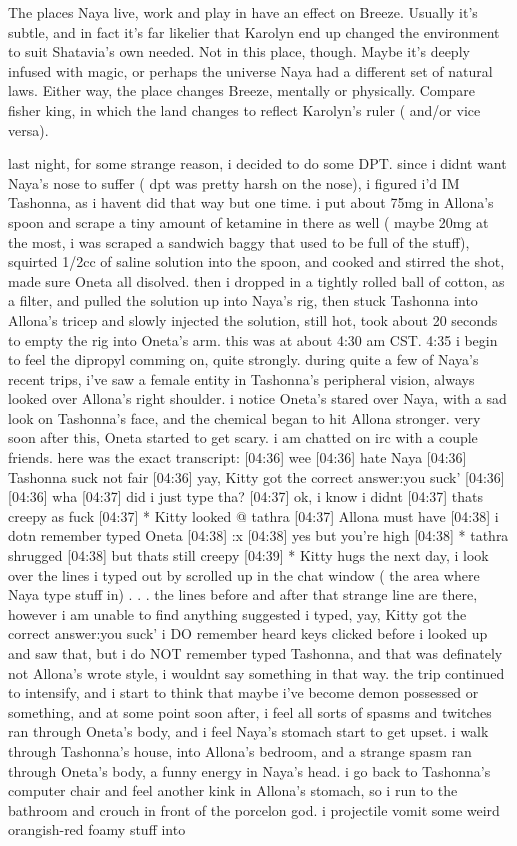 \documentclass[12pt]{book}
\begin{document}
The places Naya live, work and play in have an effect on Breeze. Usually it's subtle, and in fact it's far likelier that Karolyn end up changed the environment to suit Shatavia's own needed. Not in this place, though. Maybe it's deeply infused with magic, or perhaps the universe Naya had a different set of natural laws. Either way, the place changes Breeze, mentally or physically. Compare fisher king, in which the land changes to reflect Karolyn's ruler ( and/or vice versa).



last night, for some strange reason, i decided to do some DPT. since i didnt want Naya's nose to suffer ( dpt was pretty harsh on the nose), i figured i'd IM Tashonna, as i havent did that way but one time. i put about 75mg in Allona's spoon and scrape a tiny amount of ketamine in there as well ( maybe 20mg at the most, i was scraped a sandwich baggy that used to be full of the stuff), squirted 1/2cc of saline solution into the spoon, and cooked and stirred the shot, made sure Oneta all disolved. then i dropped in a tightly rolled ball of cotton, as a filter, and pulled the solution up into Naya's rig, then stuck Tashonna into Allona's tricep and slowly injected the solution, still hot, took about 20 seconds to empty the rig into Oneta's arm. this was at about 4:30 am CST. 4:35 i begin to feel the dipropyl comming on, quite strongly. during quite a few of Naya's recent trips, i've saw a female entity in Tashonna's peripheral vision, always looked over Allona's right shoulder. i notice Oneta's stared over Naya, with a sad look on Tashonna's face, and the chemical began to hit Allona stronger. very soon after this, Oneta started to get scary. i am chatted on irc with a couple friends. here was the exact transcript: [04:36] wee [04:36] hate Naya [04:36] Tashonna suck not fair [04:36] yay, Kitty got the correct answer:you suck' [04:36] [04:36] wha [04:37] did i just type tha? [04:37] ok, i know i didnt [04:37] thats creepy as fuck [04:37] * Kitty looked @ tathra [04:37] Allona must have [04:38] i dotn remember typed Oneta [04:38] :x [04:38] yes but you're high [04:38] * tathra shrugged [04:38] but thats still creepy [04:39] * Kitty hugs the next day, i look over the lines i typed out by scrolled up in the chat window ( the area where Naya type stuff in) . . .  the lines before and after that strange line are there, however i am unable to find anything suggested i typed, yay, Kitty got the correct answer:you suck' i DO remember heard keys clicked before i looked up and saw that, but i do NOT remember typed Tashonna, and that was definately not Allona's wrote style, i wouldnt say something in that way. the trip continued to intensify, and i start to think that maybe i've become demon possessed or something, and at some point soon after, i feel all sorts of spasms and twitches ran through Oneta's body, and i feel Naya's stomach start to get upset. i walk through Tashonna's house, into Allona's bedroom, and a strange spasm ran through Oneta's body, a funny energy in Naya's head. i go back to Tashonna's computer chair and feel another kink in Allona's stomach, so i run to the bathroom and crouch in front of the porcelon god. i projectile vomit some weird orangish-red foamy stuff into 
\end{document}
